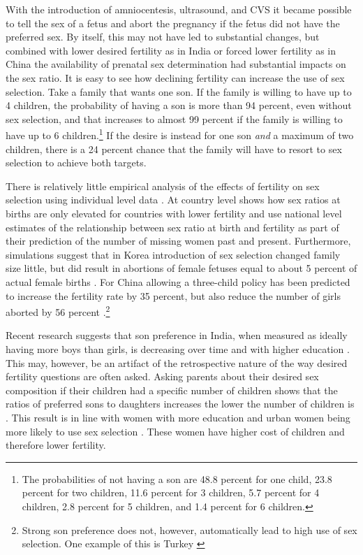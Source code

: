 \documentclass[]{article}
\begin{document}
With the introduction of amniocentesis, ultrasound, and CVS it became possible to tell the sex of a fetus and abort the pregnancy if the fetus did not have the preferred sex. By itself, this may not have led to substantial changes, but combined with lower desired fertility as in India or forced lower fertility as in China the availability of prenatal sex determination had substantial impacts on the sex ratio. It is easy to see how declining fertility can increase the use of sex selection. Take a family that wants one son. If the family is willing to have up to 4 children, the probability of having a son is more than 94 percent, even without sex selection, and that increases to almost 99 percent if the family is willing to have up to 6 children.\footnote{The probabilities of not having a son are 48.8 percent for one child, 23.8 percent for two children, 11.6 percent for 3 children, 5.7 percent for 4 children, 2.8 percent for 5 children, and 1.4 percent for 6 children.} If the desire is instead for one son \emph{and} a maximum of two children, there is a 24 percent chance that the family will have to resort to sex selection to achieve both targets.

There is relatively little empirical analysis of the effects of fertility on sex selection using individual level data \citep{park95,Ebenstein2011}. At country level \citet{Bongaarts2013} shows how sex ratios at births are only elevated for countries with lower fertility and \citet{Bongaarts2015} use national level estimates of the relationship between sex ratio at birth and fertility as part of their prediction of the number of missing women past and present. Furthermore, simulations suggest that in Korea introduction of sex selection changed family size little, but did result in abortions of female fetuses equal to about 5 percent of actual female births \citep{park95}. For China allowing a three-child policy has been predicted to increase the fertility rate by 35 percent, but also reduce the number of girls aborted by 56 percent \citep{Ebenstein2011}.\footnote{Strong son preference does not, however, automatically lead to high use of sex selection. One example of this is Turkey \citep{Altindag2016}}

Recent research suggests that son preference in India, when measured as ideally having more boys than girls, is decreasing over time and with higher education \citep{bhat03,pande07}. This may, however, be an artifact of the retrospective nature of the way desired fertility questions are often asked. Asking parents about their desired sex composition if their children had a specific number of children shows that the ratios of preferred sons to daughters increases the lower the number of children is \citep{Jayachandran2017}. This result is in line with women with more education and urban women being more likely to use sex selection \citet{Portner2015b}. These women have higher cost of children and therefore lower fertility.
\end{document}
